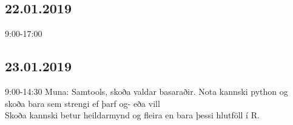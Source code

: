 \documentclass{article}
\begin{document}
\subsection*{22.01.2019}
9:00-17:00

\subsection*{23.01.2019}
9:00-14:30
Muna:
Samtools, skoða valdar basaraðir. Nota kannski python og skoða bara sem  strengi ef þarf og- eða vill \\
Skoða kannski betur heildarmynd og fleira en bara þessi hlutföll í R.
\end{document}
